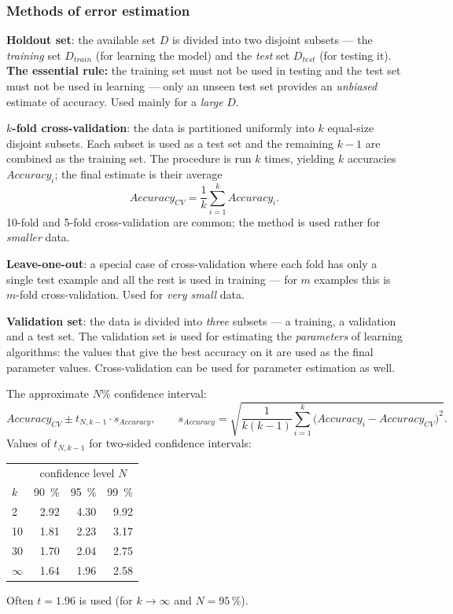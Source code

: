 \documentclass[11pt,a4paper]{article}
\theoremstyle{definition}
\begin{document}
\subsubsection{Methods of error estimation}

\begin{defbox}
\textbf{Holdout set}: the available set $D$ is divided into two disjoint subsets --- the
\emph{training} set $D_{train}$ (for learning the model) and the \emph{test} set $D_{test}$ (for
testing it). \textbf{The essential rule:} the training set must not be used in testing and the test
set must not be used in learning --- only an unseen test set provides an \emph{unbiased} estimate
of accuracy. Used mainly for a \emph{large} $D$.

\textbf{$k$-fold cross-validation}: the data is partitioned uniformly into $k$ equal-size disjoint
subsets. Each subset is used as a test set and the remaining $k-1$ are combined as the training set.
The procedure is run $k$ times, yielding $k$ accuracies $\mathit{Accuracy}_i$; the final estimate
is their average
\[ \mathit{Accuracy}_{CV}=\frac1k\sum_{i=1}^{k}\mathit{Accuracy}_i. \]
10-fold and 5-fold cross-validation are common; the method is used rather for \emph{smaller} data.

\textbf{Leave-one-out}: a special case of cross-validation where each fold has only a single test
example and all the rest is used in training --- for $m$ examples this is $m$-fold
cross-validation. Used for \emph{very small} data.

\textbf{Validation set}: the data is divided into \emph{three} subsets --- a training, a validation
and a test set. The validation set is used for estimating the \emph{parameters} of learning
algorithms: the values that give the best accuracy on it are used as the final parameter values.
Cross-validation can be used for parameter estimation as well.
\end{defbox}

\begin{defbox}
The approximate $N\%$ confidence interval:
\[ \mathit{Accuracy}_{CV}\pm t_{N,k-1}\cdot s_{\mathit{Accuracy}},\qquad
   s_{\mathit{Accuracy}}=\sqrt{\frac{1}{k(k-1)}\sum_{i=1}^{k}
   \big(\mathit{Accuracy}_i-\mathit{Accuracy}_{CV}\big)^2}. \]
Values of $t_{N,k-1}$ for two-sided confidence intervals:
\begin{center}
\small
\begin{tabular}{@{}lrrr@{}}
\toprule
& \multicolumn{3}{c}{confidence level $N$} \\
$k$ & 90~\% & 95~\% & 99~\% \\
\midrule
2 & 2.92 & 4.30 & 9.92 \\
10 & 1.81 & 2.23 & 3.17 \\
30 & 1.70 & 2.04 & 2.75 \\
$\infty$ & 1.64 & 1.96 & 2.58 \\
\bottomrule
\end{tabular}
\end{center}
Often $t=1.96$ is used (for $k\to\infty$ and $N=95\,\%$).
\end{defbox}
\end{document}

